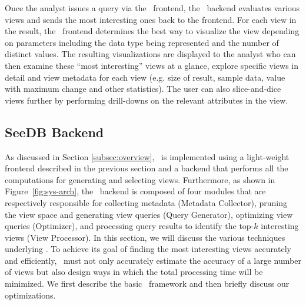 Once the analyst issues a query via the \SeeDB\ frontend, the \SeeDB\ backend
evaluates various views and sends the most interesting ones back to the
frontend.
For each view in the result, the \SeeDB\ frontend determines the best
way to visualize the view depending on parameters including the data
type being represented and the number of distinct values. 
The resulting
visualizations are displayed to the analyst who can then examine
these ``most interesting'' views at a glance, explore specific views in detail and
view metadata for each view (e.g. size of result, sample data, value with
maximum change and other statistics). 
The user can also slice-and-dice views further by performing drill-downs on the 
relevant attributes in the view. 

\subsection{SeeDB Backend}
\label{subsec:seedb_backend}

As discussed in Section \ref{subsec:overview}, \SeeDB\ is implemented using a
light-weight frontend described in the previous section and a backend that
performs all the computations for generating and selecting views. Furthermore,
as shown in Figure~\ref{fig:sys-arch}, the \SeeDB\ backend is composed of four
modules that are respectively responsible for collecting metadata (Metadata Collector), pruning
the view space and generating view queries (Query Generator), optimizing view
queries (Optimizer), and processing query results to identify the top-$k$
interesting views (View Processor). In this section, we will discuss the various
techniques underlying \SeeDB. To achieve its goal of finding the most
interesting views accurately and efficiently, \SeeDB\ must not only accurately
estimate the accuracy of a large number of views but also design ways in which
the total processing time will be minimized.
We first describe the basic \SeeDB\ framework and then briefly discuss our optimizations.


